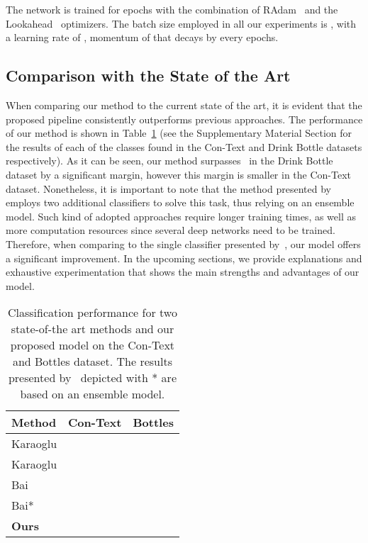 \documentclass[10pt,twocolumn,letterpaper]{article}
\begin{document}
The network is trained for  epochs with the combination of RAdam~\cite{liu2019radam} and the Lookahead~\cite{zhang2019lookahead} optimizers. The batch size employed in all our experiments is , with a learning rate of , momentum of  that decays by  every  epochs.







\subsection{Comparison with the State of the Art}
When comparing our method to the current state of the art, it is evident that the proposed pipeline consistently outperforms previous approaches. The performance of our method is shown in Table~\ref{table:context_bottles_short} (see the Supplementary Material Section for the results of each of the classes found in the Con-Text and Drink Bottle datasets respectively). As it can be seen, our method surpasses~\cite{bai2018integrating} in the Drink Bottle dataset by a significant margin, however this margin is smaller in the Con-Text dataset. Nonetheless, it is important to note that the method presented by~\cite{bai2018integrating} employs two additional classifiers to solve this task, thus relying on an ensemble model. Such kind of adopted approaches require longer training times, as well as more computation resources since several deep networks need to be trained. Therefore, when comparing to the single classifier presented by~\cite{bai2018integrating}, our model offers a significant improvement. In the upcoming sections, we provide explanations and exhaustive experimentation that shows the main strengths and advantages of our model.
\begin{table}[h]
\normalsize
\setlength\tabcolsep{2pt}
\begin{center}
\begin{tabular}{l|l|l}
\hline
\textbf{Method} & \textbf{Con-Text} & \textbf{Bottles}\\ \hline
Karaoglu\cite{karaoglu2013text} &  & \\ \hline
Karaoglu\cite{karaoglu2017words} &  & \\ \hline
Bai\cite{bai2018integrating} &  & \\ \hline
Bai*\cite{bai2018integrating} &  & \\ \hline
\textbf{Ours} & \boldmath  & \boldmath\\ \hline
\end{tabular}
\end{center}
\caption{Classification performance for two state-of-the art methods and our proposed model on the Con-Text and Bottles dataset. The results presented by~\cite{bai2018integrating} depicted with * are based on an ensemble model.}
\label{table:context_bottles_short}
\end{table}
\end{document}
